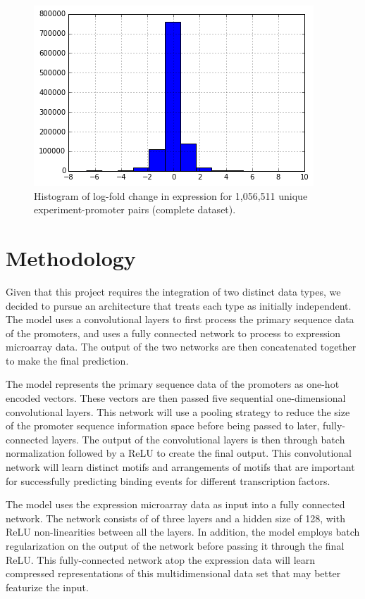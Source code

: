 \documentclass{article}
\begin{document}
	\begin{figure}[H]
	\begin{center}
	\includegraphics[scale=0.5]{fig/hist}
	\end{center}
	\caption{Histogram of log-fold change in expression for 1,056,511 unique experiment-promoter pairs (complete dataset).}
	\end{figure}

\section{Methodology}

Given that this project requires the integration of two distinct data types, we decided to pursue an architecture that treats each type as initially independent. The model uses a convolutional layers to first process the primary sequence data of the promoters, and uses a fully connected network to process to expression microarray data. The output of the two networks are then concatenated together to make the final prediction.

The model represents the primary sequence data of the promoters as one-hot encoded vectors. These vectors are then passed five sequential one-dimensional convolutional layers. This network will use a pooling strategy to reduce the size of the promoter sequence information space before being passed to later, fully-connected layers. The output of the convolutional layers is then through batch normalization followed by a ReLU to create the final output. This convolutional network will learn distinct motifs and arrangements of motifs that are important for successfully predicting binding events for different transcription factors.

The model uses the expression microarray data as input into a fully connected network. The network consists of of three layers and a hidden size of 128, with ReLU non-linearities between all the layers. In addition, the model employs batch regularization on the output of the network before passing it through the final ReLU.  This fully-connected network atop the expression data will learn compressed representations of this multidimensional data set that may better featurize the input.
\end{document}
